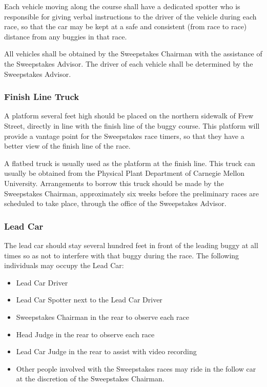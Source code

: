 	Each vehicle moving along the course shall have a dedicated spotter who is responsible 
	for giving verbal instructions to the driver of the vehicle during each race, so that 
	the car may be kept at a safe and consistent (from race to race) distance from any
	buggies in that race.
	
	All vehicles shall be obtained by the Sweepstakes Chairman with the assistance of 
	the Sweepstakes Advisor. The driver of each vehicle shall be determined by the 
	Sweepstakes Advisor.


\subsubsection{Finish Line Truck}

	A platform several feet high should be placed on the northern sidewalk of Frew
	Street, directly in line with the finish line of the buggy course. This
	platform will provide a vantage point for the Sweepstakes race timers, so that
	they have a better view of the finish line of the race.

	A flatbed truck is usually used as the platform at the finish line. This truck
	can usually be obtained from the Physical Plant Department of Carnegie Mellon
	University. Arrangements to borrow this truck should be made by the Sweepstakes
	Chairman, approximately six weeks before the preliminary races are scheduled to
	take place, through the office of the Sweepstakes Advisor.


\subsubsection{Lead Car}

	The lead car should stay several hundred feet in front of the leading buggy at all times so
	as not to interfere with that buggy during the race. The following individuals may occupy 
	the Lead Car:
	
	\begin{itemize}
		
		\item Lead Car Driver
		
		\item Lead Car Spotter next to the Lead Car Driver
		
		\item Sweepstakes Chairman in the rear to observe each race
		
		\item Head Judge in the rear to observe each race
		
		\item Lead Car Judge in the rear to assist with video recording
		
		\item Other people involved with the Sweepstakes races may ride in the follow
		car at the discretion of the Sweepstakes Chairman.
		
	\end{itemize}
	
